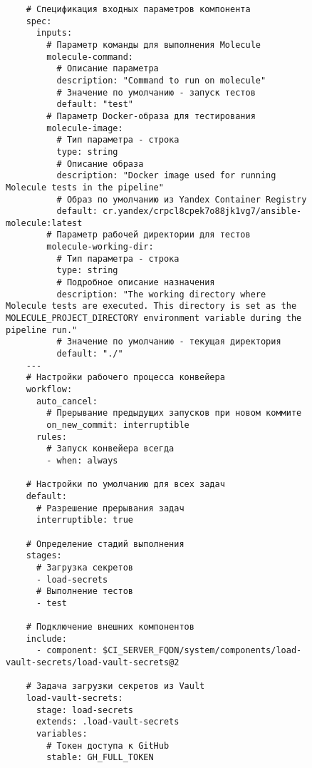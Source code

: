 \begin{figure}
  \centering
  \scriptsize
  \begin{verbatim}
    # Спецификация входных параметров компонента
    spec:
      inputs:
        # Параметр команды для выполнения Molecule
        molecule-command:
          # Описание параметра
          description: "Command to run on molecule"
          # Значение по умолчанию - запуск тестов
          default: "test"
        # Параметр Docker-образа для тестирования
        molecule-image:
          # Тип параметра - строка
          type: string
          # Описание образа
          description: "Docker image used for running Molecule tests in the pipeline"
          # Образ по умолчанию из Yandex Container Registry
          default: cr.yandex/crpcl8cpek7o88jk1vg7/ansible-molecule:latest
        # Параметр рабочей директории для тестов
        molecule-working-dir:
          # Тип параметра - строка
          type: string
          # Подробное описание назначения
          description: "The working directory where Molecule tests are executed. This directory is set as the MOLECULE_PROJECT_DIRECTORY environment variable during the pipeline run."
          # Значение по умолчанию - текущая директория
          default: "./"
    ---
    # Настройки рабочего процесса конвейера
    workflow:
      auto_cancel:
        # Прерывание предыдущих запусков при новом коммите
        on_new_commit: interruptible
      rules:
        # Запуск конвейера всегда
        - when: always

    # Настройки по умолчанию для всех задач
    default:
      # Разрешение прерывания задач
      interruptible: true

    # Определение стадий выполнения
    stages:
      # Загрузка секретов
      - load-secrets
      # Выполнение тестов
      - test

    # Подключение внешних компонентов
    include:
      - component: $CI_SERVER_FQDN/system/components/load-vault-secrets/load-vault-secrets@2

    # Задача загрузки секретов из Vault
    load-vault-secrets:
      stage: load-secrets
      extends: .load-vault-secrets
      variables:
        # Токен доступа к GitHub
        stable: GH_FULL_TOKEN


\end{verbatim}
\end{figure}
